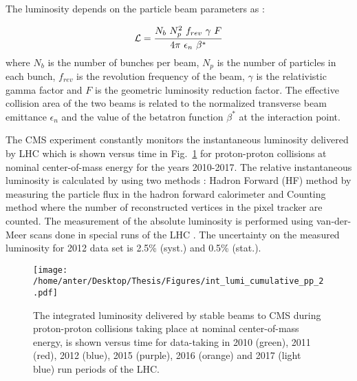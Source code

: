 The luminosity depends on the particle beam parameters as :

\begin{equation}
\lumi = \frac{N_b~N^2_p~f_{rev}~\gamma~F}{4\pi~\epsilon_n~\beta^*}
\end{equation}
where $N_b$ is the number of bunches per beam, $N_p$ is the number of particles in each bunch, $f_{rev}$ is the revolution frequency of the beam, $\gamma$ is the relativistic gamma factor and $F$ is the geometric luminosity reduction factor. The effective collision area of the two beams is related to the normalized transverse beam emittance $\epsilon_n$ and the value of the betatron function $ \beta^*$ at the interaction point.
 
The CMS experiment constantly monitors the instantaneous luminosity delivered by LHC which is shown versus time in Fig.~\ref{fig:lumi} for proton-proton collisions at nominal center-of-mass energy for the years 2010-2017. The relative instantaneous luminosity is calculated by using two methods \cite{CMS:2013gfa} : Hadron Forward (HF) method by measuring the particle flux in the hadron forward calorimeter and Counting method where the number of reconstructed vertices in the pixel tracker are counted. The measurement of the absolute luminosity is performed using van-der-Meer scans done in special runs of the LHC \cite{vanderMeer:1968zz}. The uncertainty on the measured luminosity for 2012 data set is 2.5\% (syst.) and 0.5\% (stat.).

\begin{figure}[!h]
 \begin{center}
 \vspace*{4mm} 
 \texttt{[image: /home/anter/Desktop/Thesis/Figures/int\_lumi\_cumulative\_pp\_2.pdf]}\\
 \vspace*{5mm}
 \caption[The integrated luminosity delivered by stable beams to CMS during proton-proton collisions.]{The integrated luminosity delivered by stable beams to CMS during proton-proton collisions taking place at nominal center-of-mass energy, is shown versus time for data-taking in 2010 (green), 2011 (red), 2012 (blue), 2015 (purple), 2016 (orange) and 2017 (light blue) run periods of the LHC\footnotemark.}
 \label{fig:lumi}
 \end{center}
\end{figure}

